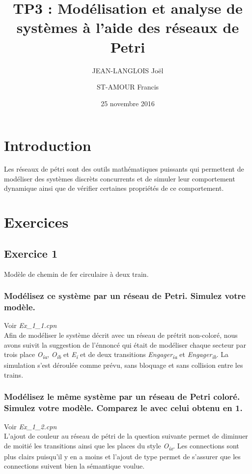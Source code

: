 \documentclass[french]{article}
\title{TP3 : Modélisation et analyse de systèmes à l'aide des réseaux de Petri}
\author{
    JEAN-LANGLOIS Joël
    \and
    ST-AMOUR Francis
  }
\date{25 novembre 2016}
\begin{document}
\maketitle

\section{Introduction}

Les réseaux de pétri sont des outils mathématiques puissants qui permettent de modéliser des systèmes discrèts concurrents et de simuler leur comportement dynamique ainsi que de vérifier certaines propriétés de ce comportement.

\section{Exercices}

\subsection{Exercice 1}
Modèle de chemin de fer circulaire à deux train.

\subsubsection{Modélisez ce système par un réseau de Petri. Simulez votre modèle.}
Voir \textit{Ex\_1\_1.cpn} \\

Afin de modéliser le système décrit avec un réseau de prétrit non-coloré, nous avons suivit la suggestion de l'énnoncé qui était de modéliser chaque secteur par trois place \textit{O\textsubscript{ia}}, \textit{O\textsubscript{ib}} et \textit{E\textsubscript{i}} et de deux transitions \textit{Engager\textsubscript{ia}} et \textit{Engager\textsubscript{ib}.}  La simulation s'est déroulée comme prévu, sans bloquage et sans collision entre les trains. 
\subsubsection{Modélisez le même système par un réseau de Petri coloré. Simulez votre modèle. Comparez le avec celui obtenu 
en 1.}
Voir \textit{Ex\_1\_2.cpn} \\

L'ajout de couleur au réseau de pétri de la question suivante permet de diminuer de moitié les transitions ainsi que les places du style \textit{O\textsubscript{ix}}. Les connections sont plus clairs puisqu'il y en a moins et l'ajout de type permet de s'assurer que les connections suivent bien la sémantique voulue.
\end{document}
